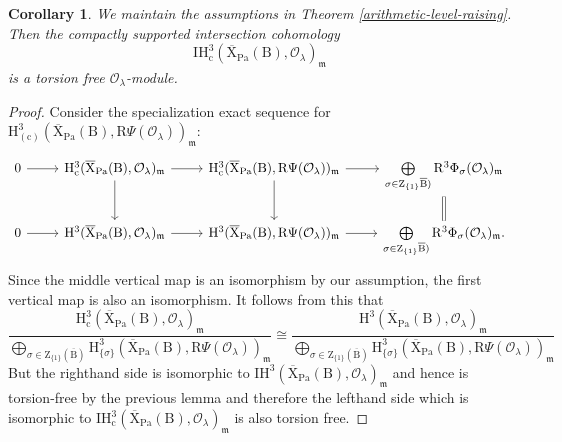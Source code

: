 \documentclass[10pt]{amsart}
\numberwithin{equation}{section}
\newtheorem{corollary}[equation]{Corollary}
\theoremstyle{definition}
\def\Pa{\mathrm{Pa}}
\def\calO{\mathcal{O}}
\def\fracm{\mathfrak{m}}
\def\rmc{\mathrm{c}}
\def\rmB{\mathrm{B}}
\def\rmH{\mathrm{H}}
\def\rmR{\mathrm{R}}
\def\rmX{\mathrm{X}}
\def\rmZ{\mathrm{Z}}
\begin{document}
\begin{corollary}
We maintain the assumptions in Theorem \ref{arithmetic-level-raising}. Then the compactly supported intersection cohomology
\begin{equation*}
\mathrm{IH}^{3}_{\rmc}(\overline{\rmX}_{\Pa}(\rmB), \calO_{\lambda})_{\fracm}
\end{equation*}
is a torsion free $\calO_{\lambda}$-module.
 \end{corollary}
\begin{proof}
Consider the specialization exact sequence for $\rmH^{3}_{(\rmc)}(\overline{\rmX}_{\Pa}(\rmB), \rmR\Psi(\calO_{\lambda}))_{\fracm}$:
\begin{equation*}
\begin{tikzcd}
0 \arrow[r] & \rmH^{3}_{\rmc}(\overline{\rmX}_{\Pa}(\rmB), \calO_{\lambda})_{\fracm} \arrow[r] \arrow[d] & \rmH^{3}_{\rmc}(\overline{\rmX}_{\Pa}(\rmB), \rmR\Psi(\calO_{\lambda}))_{\fracm} \arrow[r] \arrow[d] & \bigoplus\limits_{\sigma\in \rmZ_{\{1\}}\overline{\rmB})}\rmR^{3}\Phi_{\sigma}(\calO_{\lambda})_{\fracm} \arrow[d, equal] \\
0 \arrow[r] & \rmH^{3}(\overline{\rmX}_{\Pa}(\rmB), \calO_{\lambda})_{\fracm} \arrow[r]           & \rmH^{3}(\overline{\rmX}_{\Pa}(\rmB), \rmR\Psi(\calO_{\lambda}))_{\fracm}\arrow[r]           & \bigoplus\limits_{\sigma\in \rmZ_{\{1\}}\overline{\rmB})}\rmR^{3}\Phi_{\sigma}(\calO_{\lambda})_{\fracm}.       
\end{tikzcd}
\end{equation*}
Since the middle vertical map is an isomorphism by our assumption, the first vertical map is also an isomorphism. It follows from this that
\begin{equation*}
\frac{\rmH^{3}_{\mathrm{c}}(\overline{\rmX}_{\Pa}(\rmB), \calO_{\lambda})_{\fracm}}{\bigoplus\limits_{\sigma\in \rmZ_{\{1\}}(\overline{\rmB})}\rmH^{3}_{\{\sigma\}}(\overline{\rmX}_{\Pa}(\rmB), \rmR\Psi(\calO_{\lambda}))_{\fracm}}\cong
\frac{\rmH^{3}(\overline{\rmX}_{\Pa}(\rmB), \calO_{\lambda})_{\fracm}}{\bigoplus\limits_{\sigma\in \rmZ_{\{1\}}(\overline{\rmB})}\rmH^{3}_{\{\sigma\}}(\overline{\rmX}_{\Pa}(\rmB), \rmR\Psi(\calO_{\lambda}))_{\fracm}}
\end{equation*}
But the righthand side is isomorphic to $\mathrm{IH}^{3}(\overline{\rmX}_{\Pa}(\rmB), \calO_{\lambda})_{\fracm}$ and hence is torsion-free by the previous lemma and therefore the lefthand side which is isomorphic to $\mathrm{IH}^{3}_{\rmc}(\overline{\rmX}_{\Pa}(\rmB), \calO_{\lambda})_{\fracm}$ is also torsion free.
\end{proof}
\end{document}
